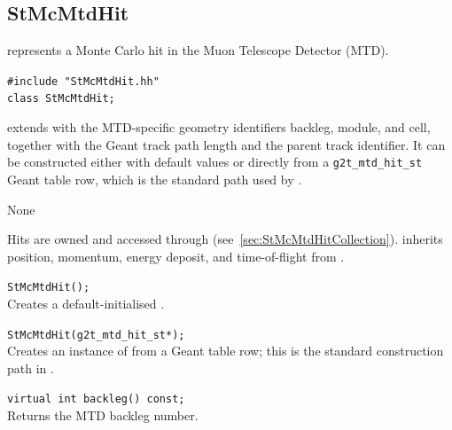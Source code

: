 %
%
\subsection{StMcMtdHit}
 
\label{sec:StMcMtdHit}
\begin{Entry}
\item[Summary]
     represents a Monte Carlo hit in the Muon
    Telescope Detector (MTD).

\item[Synopsis]
    \verb+#include "StMcMtdHit.hh"+\\
    \verb+class StMcMtdHit;+\\

\item[Description]
     extends  with the MTD-specific
    geometry identifiers backleg, module, and cell, together with
    the Geant track path length and the parent track identifier.
    It can be constructed either with default values or directly
    from a \texttt{g2t\_mtd\_hit\_st} Geant table row, which is
    the standard path used by .

\item[Persistence]
    None

\item[Related Classes]
    Hits are owned and accessed through
     (see~\ref{sec:StMcMtdHitCollection}).
     inherits position, momentum, energy deposit,
    and time-of-flight from .

\item[Public\\ Constructors]
    \verb+StMcMtdHit();+\\
    Creates a default-initialised .

    \verb+StMcMtdHit(g2t_mtd_hit_st*);+\\
    Creates an instance of  from a Geant table
    row; this is the standard construction path in
    .

\item[Public Member\\ Functions]
    \verb+virtual int backleg() const;+\\
    Returns the MTD backleg number.\\


\end{Entry}
